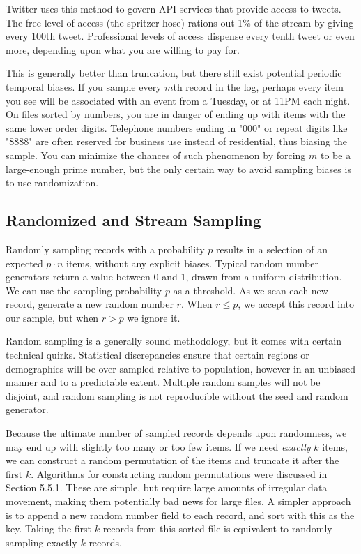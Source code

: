 \documentclass[10pt]{article}
\begin{document}
\begin{enumerate}
Twitter uses this method to govern API services that provide access to tweets. The free level of access (the spritzer hose) rations out 1\% of the stream by giving every 100th tweet. Professional levels of access dispense every tenth tweet or even more, depending upon what you are willing to pay for.

This is generally better than truncation, but there still exist potential periodic temporal biases. If you sample every $m$th record in the log, perhaps every item you see will be associated with an event from a Tuesday, or at 11PM each night. On files sorted by numbers, you are in danger of ending up with items with the same lower order digits. Telephone numbers ending in "000" or repeat digits like "8888" are often reserved for business use instead of residential, thus biasing the sample. You can minimize the chances of such phenomenon by forcing $m$ to be a large-enough prime number, but the only certain way to avoid sampling biases is to use randomization.

\subsection{Randomized and Stream Sampling}
Randomly sampling records with a probability $p$ results in a selection of an expected $p \cdot n$ items, without any explicit biases. Typical random number generators return a value between 0 and 1, drawn from a uniform distribution. We can use the sampling probability $p$ as a threshold. As we scan each new record, generate a new random number $r$. When $r \leq p$, we accept this record into our sample, but when $r > p$ we ignore it.

Random sampling is a generally sound methodology, but it comes with certain technical quirks. Statistical discrepancies ensure that certain regions or demographics will be over-sampled relative to population, however in an unbiased manner and to a predictable extent. Multiple random samples will not be disjoint, and random sampling is not reproducible without the seed and random generator.

Because the ultimate number of sampled records depends upon randomness, we may end up with slightly too many or too few items. If we need \textit{exactly} $k$ items, we can construct a random permutation of the items and truncate it after the first $k$. Algorithms for constructing random permutations were discussed in Section 5.5.1. These are simple, but require large amounts of irregular data movement, making them potentially bad news for large files. A simpler approach is to append a new random number field to each record, and sort with this as the key. Taking the first $k$ records from this sorted file is equivalent to randomly sampling exactly $k$ records.


\end{enumerate}
\end{document}
